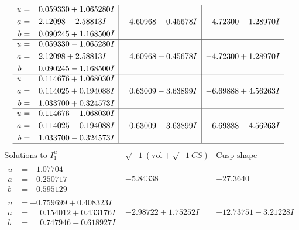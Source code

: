 \documentclass[1p]{elsarticle_modified}
\theoremstyle{definition}
\newcommand{\I}{\sqrt{-1}}
\begin{document}
$$\begin{array}{c|c|c}
\begin{aligned}
u &= \phantom{-}0.059330 + 1.065280 I \\
a &= \phantom{-}2.12098 - 2.58813 I \\
b &= \phantom{-}0.090245 + 1.168500 I\end{aligned}
 & \phantom{-}4.60968 - 0.45678 I & -4.72300 - 1.28970 I \\ \hline\begin{aligned}
u &= \phantom{-}0.059330 - 1.065280 I \\
a &= \phantom{-}2.12098 + 2.58813 I \\
b &= \phantom{-}0.090245 - 1.168500 I\end{aligned}
 & \phantom{-}4.60968 + 0.45678 I & -4.72300 + 1.28970 I \\ \hline\begin{aligned}
u &= \phantom{-}0.114676 + 1.068030 I \\
a &= \phantom{-}0.114025 + 0.194088 I \\
b &= \phantom{-}1.033700 + 0.324573 I\end{aligned}
 & \phantom{-}0.63009 - 3.63899 I & -6.69888 + 4.56263 I \\ \hline\begin{aligned}
u &= \phantom{-}0.114676 - 1.068030 I \\
a &= \phantom{-}0.114025 - 0.194088 I \\
b &= \phantom{-}1.033700 - 0.324573 I\end{aligned}
 & \phantom{-}0.63009 + 3.63899 I & -6.69888 - 4.56263 I\\
 \hline 
 \end{array}$$\newpage$$\begin{array}{c|c|c}  
\text{Solutions to }I^u_{1}& \I (\text{vol} + \sqrt{-1}CS) & \text{Cusp shape}\\
 \hline 
\begin{aligned}
u &= -1.07704\phantom{ +0.000000I} \\
a &= -0.250717\phantom{ +0.000000I} \\
b &= -0.595129\phantom{ +0.000000I}\end{aligned}
 & -5.84338\phantom{ +0.000000I} & -27.3640\phantom{ +0.000000I} \\ \hline\begin{aligned}
u &= -0.759699 + 0.408323 I \\
a &= \phantom{-}0.154012 + 0.433176 I \\
b &= \phantom{-}0.747946 - 0.618927 I\end{aligned}
 & -2.98722 + 1.75252 I & -12.73751 - 3.21228 I \\ \hline\begin{aligned}

\end{aligned}
\end{array}$$
\end{document}
